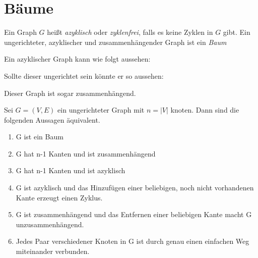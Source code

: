 \section{Bäume}
\begin{definition}
Ein Graph $G$ heißt \emph{azyklisch} oder \emph{zyklenfrei}, falls es keine Zyklen in $G$ gibt. Ein ungerichteter, azyklischer und zusammenhängender Graph ist ein \emph{Baum}
\end{definition}
\begin{example}
Ein azyklischer Graph kann wie folgt aussehen:
\begin{center}
\end{center}
Sollte dieser ungerichtet sein könnte er so aussehen:
\begin{center}
\end{center}
Dieser Graph ist sogar zusammenhängend.
\end{example}
\begin{theorem}
Sei $G=(V,E)$ ein ungerichteter Graph mit $n=|V|$ knoten. Dann sind die folgenden Aussagen äquivalent.
\begin{enumerate}
	\item G ist ein Baum
	\item G hat n-1 Kanten und ist zusammenhängend
	\item G hat n-1 Kanten und ist azyklisch
	\item G ist azyklisch und das Hinzufügen einer beliebigen, noch nicht vorhandenen Kante erzeugt einen Zyklus.
	\item G ist zusammenhängend und das Entfernen einer beliebigen Kante macht G unzusammenhängend.
	\item Jedes Paar verschiedener Knoten in G ist durch genau einen einfachen Weg miteinander verbunden.
\end{enumerate}
\end{theorem}
